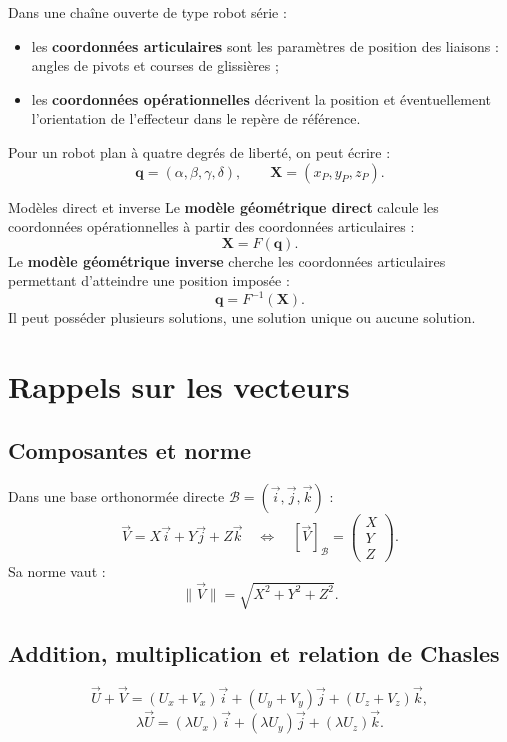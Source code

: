 Dans une chaîne ouverte de type robot série :
\begin{itemize}
  \item les \textbf{coordonnées articulaires} sont les paramètres de
  position des liaisons : angles de pivots et courses de glissières ;
  \item les \textbf{coordonnées opérationnelles} décrivent la position
  et éventuellement l'orientation de l'effecteur dans le repère de
  référence.
\end{itemize}

Pour un robot plan à quatre degrés de liberté, on peut écrire :
\[
\mathbf q=(\alpha,\beta,\gamma,\delta),
\qquad
\mathbf X=(x_P,y_P,z_P).
\]

\begin{TLThreeDef}{Modèles direct et inverse}
Le \textbf{modèle géométrique direct} calcule les coordonnées
opérationnelles à partir des coordonnées articulaires :
\[
\mathbf X=F(\mathbf q).
\]
Le \textbf{modèle géométrique inverse} cherche les coordonnées
articulaires permettant d'atteindre une position imposée :
\[
\mathbf q=F^{-1}(\mathbf X).
\]
Il peut posséder plusieurs solutions, une solution unique ou aucune
solution.
\end{TLThreeDef}

\section{Rappels sur les vecteurs}
\label{sec:les-vecteurs}

\subsection{Composantes et norme}

Dans une base orthonormée directe
$\mathcal B=(\vec i,\vec j,\vec k)$ :
\[
\vec V=X\vec i+Y\vec j+Z\vec k
\quad\Longleftrightarrow\quad
[\vec V]_{\mathcal B}=\begin{pmatrix}X\\Y\\Z\end{pmatrix}.
\]
Sa norme vaut :
\[
\boxed{\|\vec V\|=\sqrt{X^2+Y^2+Z^2}.}
\]

\subsection{Addition, multiplication et relation de Chasles}

\[
\vec U+\vec V=
(U_x+V_x)\vec i+(U_y+V_y)\vec j+(U_z+V_z)\vec k,
\]
\[
\lambda\vec U=(\lambda U_x)\vec i+(\lambda U_y)\vec j+(\lambda U_z)\vec k.
\]

